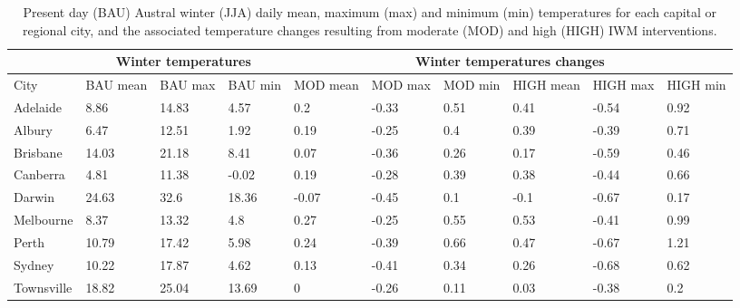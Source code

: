 \documentclass[utf8]{frontiersSCNS} %
\begin{document}
\setlength\arrayrulewidth{1pt} %
\begin{table}[!ht]\caption{Present day (BAU) Austral winter (JJA) daily mean, maximum (max) and minimum (min) temperatures for each capital or regional city, and the associated temperature changes resulting from moderate (MOD) and high (HIGH) IWM interventions.}
    \centering
    \small
    \begin{tabular}{|p{1.7cm}|p{1.0cm}|p{1.0cm}|p{1.0cm}|p{1.0cm}|p{1.0cm}|p{1.0cm}|p{1.0cm}|p{1.0cm}|p{1.0cm}|}
    \hline
        \rowcolor{dark-blue}\multicolumn{1}{c|}{} & \multicolumn{3}{c|}{Winter temperatures} & \multicolumn{6}{c|}{Winter temperatures changes} \\ \hline
        \rowcolor{dark-blue}City & BAU mean & BAU max & BAU   min & MOD       mean & MOD       max & MOD        min & HIGH      mean & HIGH      max & HIGH        min \\ \hline    
        \rowcolor{light-gray}Adelaide & 8.86 & 14.83 & 4.57 & 0.2 & -0.33 & 0.51 & 0.41 & -0.54 & 0.92 \\ \hline
        \rowcolor{light-blue!25}Albury & 6.47 & 12.51 & 1.92 & 0.19 & -0.25 & 0.4 & 0.39 & -0.39 & 0.71 \\ \hline
        \rowcolor{light-gray}Brisbane & 14.03 & 21.18 & 8.41 & 0.07 & -0.36 & 0.26 & 0.17 & -0.59 & 0.46 \\ \hline
       \rowcolor{light-blue!25} Canberra & 4.81 & 11.38 & -0.02 & 0.19 & -0.28 & 0.39 & 0.38 & -0.44 & 0.66 \\ \hline
        \rowcolor{light-gray}Darwin & 24.63 & 32.6 & 18.36 & -0.07 & -0.45 & 0.1 & -0.1 & -0.67 & 0.17 \\ \hline
        \rowcolor{light-blue!25}Melbourne & 8.37 & 13.32 & 4.8 & 0.27 & -0.25 & 0.55 & 0.53 & -0.41 & 0.99 \\ \hline
        \rowcolor{light-gray}Perth & 10.79 & 17.42 & 5.98 & 0.24 & -0.39 & 0.66 & 0.47 & -0.67 & 1.21 \\ \hline
        \rowcolor{light-blue!25}Sydney & 10.22 & 17.87 & 4.62 & 0.13 & -0.41 & 0.34 & 0.26 & -0.68 & 0.62 \\ \hline
        \rowcolor{light-gray}Townsville & 18.82 & 25.04 & 13.69 & 0 & -0.26 & 0.11 & 0.03 & -0.38 & 0.2 \\ \hline
    \end{tabular}\label{table:jja}
\end{table}
\setlength\arrayrulewidth{0.4pt} %
\end{document}
